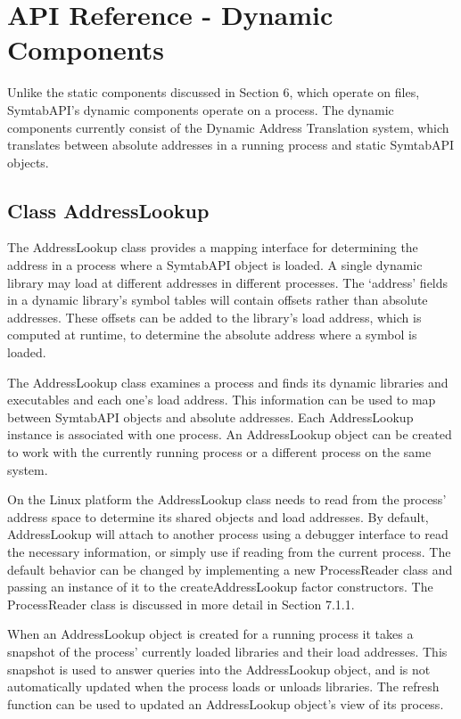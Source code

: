\section{API Reference - Dynamic Components}

Unlike the static components discussed in Section 6, which operate on files,
SymtabAPI's dynamic components operate on a process. The dynamic components currently consist of the Dynamic Address Translation system, which translates between absolute addresses in a running process and static SymtabAPI objects. 

\subsection{Class AddressLookup}

The AddressLookup class provides a mapping interface for determining the address in a process where a SymtabAPI object is loaded. A single dynamic library may load at different addresses in different processes. The `address' fields in a dynamic library's symbol tables will contain offsets rather than absolute addresses. These offsets can be added to the library's load address, which is computed at runtime, to determine the absolute address where a symbol is loaded. 

The AddressLookup class examines a process and finds its dynamic libraries and executables and each one's load address. This information can be used to map between SymtabAPI objects and absolute addresses. Each AddressLookup instance is associated with one process. An AddressLookup object can be created to work with the currently running process or a different process on the same system.

On the Linux platform the AddressLookup class needs to read from the process' address space to determine its shared objects and load addresses. By default, AddressLookup will attach to another process using a debugger interface to read the necessary information, or simply use  if reading from the current process. The default behavior can be changed by implementing a new ProcessReader class and passing an instance of it to the createAddressLookup factor constructors. The ProcessReader class is discussed in more detail in Section 7.1.1.

When an AddressLookup object is created for a running process it takes a snapshot of the process' currently loaded libraries and their load addresses. This snapshot is used to answer queries into the AddressLookup object, and is not automatically updated when the process loads or unloads libraries. The refresh function can be used to updated an AddressLookup object's view of its process.

